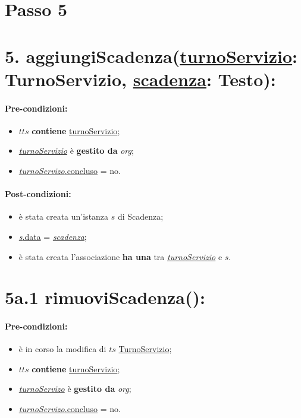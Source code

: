 \section{Passo 5}
\section*{5. aggiungiScadenza(\underline{turnoServizio}: TurnoServizio, \underline{scadenza}: Testo):}

\paragraph{Pre-condizioni:}
\begin{itemize}
  \item $tts$ \textbf{contiene} \underline{turnoServizio};
     \item \underline{\textit{turnoServizio}} è \textbf{gestito da} {\textit{org}};
   \item \underline{\textit{turnoServizo}.concluso} = no.
\end{itemize}

\paragraph{Post-condizioni:}  
\begin{itemize}
 \item è stata creata un'istanza $s$ di Scadenza;
 \item \underline{\textit{s}.data} = \underline{\textit{scadenza}};
 \item è stata creata l'associazione \textbf{ha una} tra \underline{\textit{turnoServizio}} e $s$.
\end{itemize}

\section*{5a.1 rimuoviScadenza():}

\paragraph{Pre-condizioni:}
\begin{itemize}
\item è in corso la modifica di $ts$ \underline{TurnoServizio};
 \item $tts$ \textbf{contiene} \underline{turnoServizio};
     \item \underline{\textit{turnoServizo}} è \textbf{gestito da} {\textit{org}};
   \item \underline{\textit{turnoServizo}.concluso} = no.
\end{itemize}

